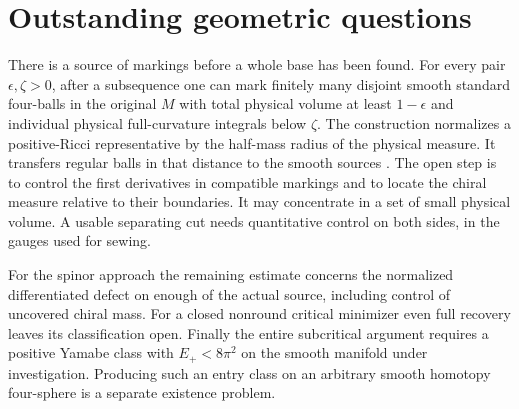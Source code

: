 \documentclass[11pt]{article}
\numberwithin{equation}{section}
\begin{document}
\section{Outstanding geometric questions}

There is a source of markings before a whole base has been found.
For every pair \(\epsilon,\zeta>0\), after a subsequence one can mark
finitely many disjoint smooth standard four-balls in the original
\(M\) with total physical volume at least \(1-\epsilon\) and individual
physical full-curvature integrals below \(\zeta\). The construction
normalizes a positive-Ricci representative by the half-mass radius of
the physical measure. It transfers regular balls in that distance to
the smooth sources \cite{Baker2026MarkedLimits}. The open step is to
control the first derivatives in compatible markings and to locate
the chiral measure relative to their boundaries. It may concentrate
in a set of small physical volume. A usable separating cut needs
quantitative control on both sides, in the gauges used for sewing.

For the spinor approach the remaining estimate concerns the
normalized differentiated defect on enough of the actual source,
including control of uncovered chiral mass. For a closed nonround
critical minimizer even full recovery leaves its classification open.
Finally the entire subcritical argument requires a positive Yamabe
class with \(E_+<8\pi^2\) on the smooth manifold under investigation.
Producing such an entry class on an arbitrary smooth homotopy
four-sphere is a separate existence problem.



\end{document}
